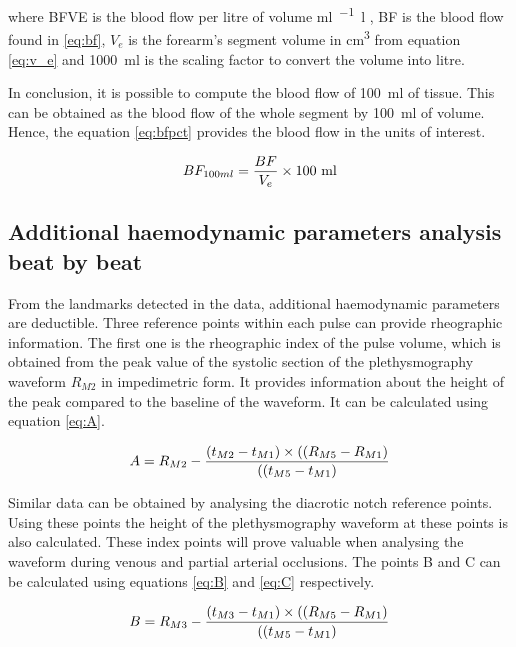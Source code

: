 where BFVE is the blood flow per litre of volume \si{\ml\per\min.\litre} , BF is the blood flow found in \ref{eq:bf}, $V_e$ is the forearm's segment volume in \si{\cubic\cm} from equation \ref{eq:v_e} and \SI{1000}{ml} is the scaling factor to convert the volume into litre.

In conclusion, it is possible to compute the blood flow of \SI{100}{\milli\litre} of tissue. This can be obtained as the blood flow of the whole segment by \SI{100}{\milli\litre} of volume. Hence, the equation \ref{eq:bfpct} provides the blood flow in the units of interest. 

\begin{align}
	\label{eq:bfpct}
	BF_{100ml} = \frac{BF}{V_e} \times \text{100 ml} \tagaddtext{[\si{\bfv}]}
\end{align}

\subsection{Additional haemodynamic parameters analysis beat by beat}
\label{section4.3.3}
From the landmarks  detected in the data, additional haemodynamic parameters are deductible. Three reference points within each pulse can provide rheographic information. The first one is the rheographic index of the pulse volume, which is obtained from the peak value of the systolic section of the plethysmography waveform $R_{M2}$ in impedimetric form. It provides information about the height of the peak compared to the baseline of the waveform. It can be calculated using equation \ref{eq:A}.

\begin{align}
	\label{eq:A}
	A = R_{M2} - \frac{(t_{M2}-t_{M1}) \times ((R_{M5}-R_{M1})}{((t_{M5}-t_{M1})} \tagaddtext{[\si{\ohm}]}
\end{align}

Similar data can be obtained by analysing the diacrotic notch reference points. Using these points the height of the plethysmography waveform at these points is also calculated. These index points will prove valuable when analysing the waveform during venous and partial arterial occlusions. The points B and C can be calculated using equations \ref{eq:B} and \ref{eq:C} respectively.  

\begin{align}
	\label{eq:B}
	B = R_{M3} - \frac{(t_{M3}-t_{M1}) \times ((R_{M5}-R_{M1})}{((t_{M5}-t_{M1})} \tagaddtext{[\si{\ohm}]}
\end{align}

